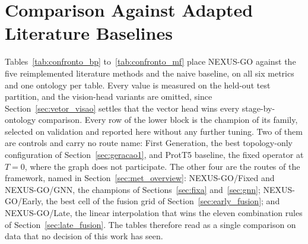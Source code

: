 \documentclass[Ingles]{ic-tese-v3}
\begin{document}
\section{Comparison Against Adapted Literature Baselines}
\label{sec:confronto}

Tables~\ref{tab:confronto_bp} to~\ref{tab:confronto_mf} place NEXUS-GO against the five
reimplemented literature methods and the naive baseline, on all six metrics and one ontology
per table. Every value is measured on the held-out test partition, and the vision-head
variants are omitted, since Section~\ref{sec:vetor_visao} settles that the vector head wins
every stage-by-ontology comparison. Every row of the lower block is the champion of its
family, selected on validation and reported here without any further tuning. Two of them are
controls and carry no route name: First Generation, the best topology-only configuration of
Section~\ref{sec:geracao1}, and ProtT5 baseline, the fixed operator at $T=0$, where the graph
does not participate. The other four are the routes of the framework, named in
Section~\ref{sec:met_overview}: NEXUS-GO/Fixed and NEXUS-GO/GNN, the champions of
Sections~\ref{sec:fixa} and~\ref{sec:gnn}; NEXUS-GO/Early, the best cell of the fusion grid
of Section~\ref{sec:early_fusion}; and NEXUS-GO/Late, the linear interpolation that wins the
eleven combination rules of Section~\ref{sec:late_fusion}. The tables therefore read as a
single comparison on data that no decision of this work has seen.
\end{document}
